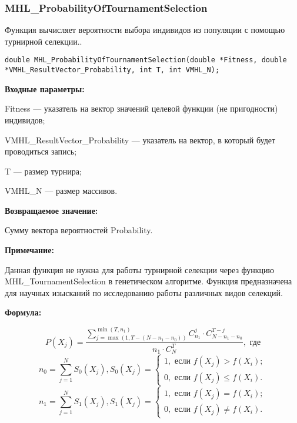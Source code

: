 \documentclass[a4paper,12pt]{article}
\begin{document}
\subsubsection{MHL\_ProbabilityOfTournamentSelection}\label{MHL_ProbabilityOfTournamentSelection}

Функция вычисляет вероятности выбора индивидов из популяции с помощью турнирной селекции..


\begin{lstlisting}[label=code_syntax_MHL_ProbabilityOfTournamentSelection,caption=Синтаксис]
double MHL_ProbabilityOfTournamentSelection(double *Fitness, double *VMHL_ResultVector_Probability, int T, int VMHL_N);
\end{lstlisting}

\textbf{Входные параметры:}  
 
 Fitness --- указатель на вектор значений целевой функции (не пригодности) индивидов;
 
 VMHL\_ResultVector\_Probability --- указатель на вектор, в который будет проводиться запись;
 
 T --- размер турнира;
 
 VMHL\_N ---  размер массивов.

\textbf{Возвращаемое значение:}

 Сумму вектора вероятностей Probability.
 
  \textbf{Примечание:}
  
   Данная функция не нужна для работы турнирной селекции через функцию MHL\_TournamentSelection в генетическом алгоритме. Функция предназначена для научных изысканий по исследованию работы  различных видов селекций.
 
 \textbf{Формула:}
 
\begin{equation*}
P\left( X_j\right) = \dfrac{\sum_{j=\max \left(1, T-\left( N-n_1-n_0\right)  \right) }^{\min \left( T, n_1\right) }C_{n_1}^j\cdot C_{ N-n_1-n_0}^{T-j}}{n_1\cdot C_N^T}, \text{ где}
\end{equation*}
\begin{equation*}
n_0=\sum_{j=1}^{N} S_0\left( X_j\right), S_0\left( X_j\right)=\left\lbrace \begin{aligned} 1, \text{ если } f\left( X_j\right)> f\left( X_i\right); \\ 0, \text{ если } f\left( X_j\right)\leq f\left( X_i\right). \end{aligned}\right.
\end{equation*}
\begin{equation*}
n_1=\sum_{j=1}^{N} S_1\left( X_j\right), S_1\left( X_j\right)=\left\lbrace \begin{aligned} 1, \text{ если } f\left( X_j\right)= f\left( X_i\right); \\ 0, \text{ если } f\left( X_j\right)\neq f\left( X_i\right). \end{aligned}\right.
\end{equation*}
\end{document}
